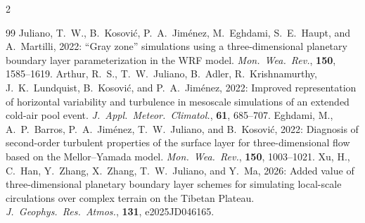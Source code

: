 \documentclass[10pt,a4paper]{article}
\begin{document}
\begin{multicols}{2}
\begin{thebibliography}{99}
 Juliano, T.~W., B.~Kosović, P.~A.~Jiménez, M.~Eghdami, S.~E.~Haupt, and A.~Martilli, 2022: ``Gray zone'' simulations using a three-dimensional planetary boundary layer parameterization in the WRF model. \emph{Mon.~Wea.~Rev.}, \textbf{150}, 1585--1619.
 Arthur, R.~S., T.~W.~Juliano, B.~Adler, R.~Krishnamurthy, J.~K.~Lundquist, B.~Kosović, and P.~A.~Jiménez, 2022: Improved representation of horizontal variability and turbulence in mesoscale simulations of an extended cold-air pool event. \emph{J.~Appl.~Meteor.~Climatol.}, \textbf{61}, 685--707.
 Eghdami, M., A.~P.~Barros, P.~A.~Jiménez, T.~W.~Juliano, and B.~Kosović, 2022: Diagnosis of second-order turbulent properties of the surface layer for three-dimensional flow based on the Mellor--Yamada model. \emph{Mon.~Wea.~Rev.}, \textbf{150}, 1003--1021.
 Xu, H., C.~Han, Y.~Zhang, X.~Zhang, T.~W.~Juliano, and Y.~Ma, 2026: Added value of three-dimensional planetary boundary layer schemes for simulating local-scale circulations over complex terrain on the Tibetan Plateau. \emph{J.~Geophys.~Res.~Atmos.}, \textbf{131}, e2025JD046165.
\end{thebibliography}
\end{multicols}
\end{document}
